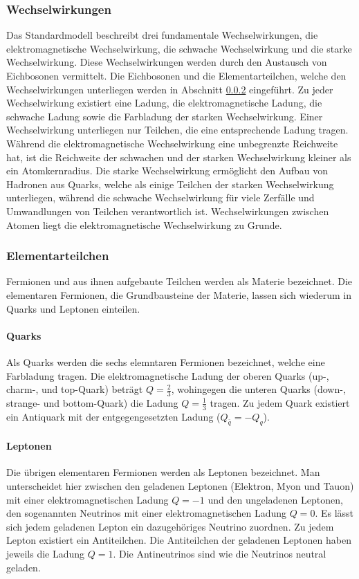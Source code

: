\subsubsection{Wechselwirkungen}
Das Standardmodell beschreibt drei fundamentale Wechselwirkungen, die elektromagnetische Wechselwirkung, die schwache Wechselwirkung und die starke Wechselwirkung. Diese Wechselwirkungen werden durch den Austausch von Eichbosonen vermittelt. Die Eichbosonen und die Elementarteilchen, welche den Wechselwirkungen unterliegen werden in Abschnitt \ref{sec:elementarteilchen} eingeführt. Zu jeder Wechselwirkung existiert eine Ladung, die elektromagnetische Ladung, die schwache Ladung sowie die Farbladung der starken Wechselwirkung. Einer Wechselwirkung unterliegen nur Teilchen, die eine entsprechende Ladung tragen. Während die elektromagnetische Wechselwirkung eine unbegrenzte Reichweite hat, ist die Reichweite der schwachen und der starken Wechselwirkung kleiner als ein Atomkernradius. Die starke Wechselwirkung ermöglicht den Aufbau von Hadronen aus Quarks, welche als einige Teilchen der starken Wechselwirkung unterliegen, während die schwache Wechselwirkung für viele Zerfälle und Umwandlungen von Teilchen verantwortlich ist. Wechselwirkungen zwischen Atomen liegt die elektromagnetische Wechselwirkung zu Grunde. \cite{demtroeder}

\subsubsection{Elementarteilchen}\label{sec:elementarteilchen}
Fermionen und aus ihnen aufgebaute Teilchen werden als Materie bezeichnet. Die elementaren Fermionen, die Grundbausteine der Materie, lassen sich wiederum in Quarks und Leptonen einteilen. \cite{griffiths}
\paragraph{Quarks} Als Quarks werden die sechs elemntaren Fermionen bezeichnet, welche eine Farbladung tragen. Die elektromagnetische Ladung der oberen Quarks (up-, charm-, und top-Quark) beträgt $Q=\frac23$, wohingegen die unteren Quarks (down-, strange- und bottom-Quark) die Ladung $Q=\frac13$ tragen. Zu jedem Quark existiert ein Antiquark mit der entgegengesetzten Ladung ($Q_{\bar{q}}=-Q_q$).
\paragraph{Leptonen} Die übrigen elementaren Fermionen werden als Leptonen bezeichnet. Man unterscheidet hier zwischen den geladenen Leptonen (Elektron, Myon und Tauon) mit einer elektromagnetischen Ladung $Q=-1$ und den ungeladenen Leptonen, den sogenannten Neutrinos mit einer elektromagnetischen Ladung $Q=0$. Es lässt sich jedem geladenen Lepton ein dazugehöriges Neutrino zuordnen. Zu jedem Lepton existiert ein Antiteilchen. Die Antiteilchen der geladenen Leptonen haben jeweils die Ladung $Q=1$. Die Antineutrinos sind wie die Neutrinos neutral geladen.
